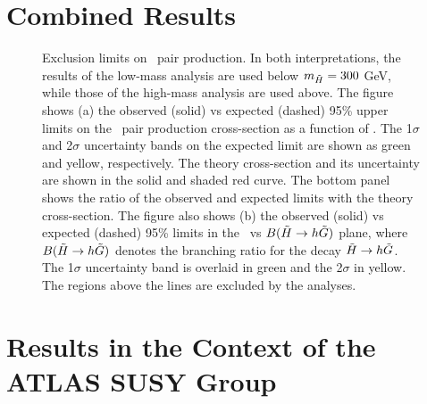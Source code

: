 \section{Combined Results}

\begin{figure}[htbp]
	\centering
	\caption{Exclusion limits on \hino\ pair production. In both interpretations, the results of the low-mass analysis are used below $m_{\tilde{H}} = 300$ GeV, while those of the high-mass analysis are used above. The figure shows (a) the observed (solid) vs expected (dashed) 95\% upper limits on the \hino\ pair production cross-section as a function of \mhino.  The 1$\sigma$ and 2$\sigma$ uncertainty bands on the expected limit are shown as green and yellow, respectively. The theory cross-section and its uncertainty are shown in the solid and shaded red curve. The bottom panel shows the ratio of the observed and expected limits with the theory cross-section. The figure also shows (b) the observed (solid) vs expected (dashed) 95\% limits in the \mhino\ vs $B(\tilde{H}\rightarrow h \tilde{G})$ plane, where $B(\tilde{H}\rightarrow h \tilde{G})$ denotes the branching ratio for the decay $\tilde{H} \rightarrow h \tilde{G}$. The 1$\sigma$ uncertainty band is overlaid in green and the 2$\sigma$ in yellow. The regions above the lines are excluded by the analyses.} 
	\label{fig:exclusion}
\end{figure}

\section{Results in the Context of the ATLAS SUSY Group}